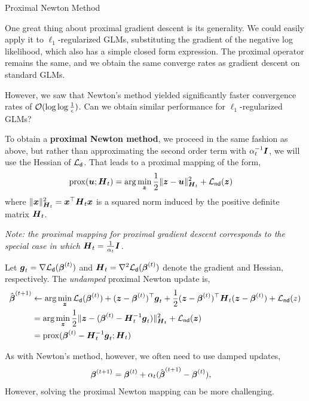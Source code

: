\documentclass[aspectratio=169]{beamer}
\begin{document}
\begin{frame}[t,allowframebreaks]{Proximal Newton Method}\label{proximal-newton-method}

One great thing about proximal gradient descent is its generality. We
could easily apply it to \(\ell_1\)-regularized GLMs, substituting the
gradient of the negative log likelihood, which also has a simple closed
form expression. The proximal operator remains the same, and we obtain
the same converge rates as gradient descent on standard GLMs.

However, we saw that Newton's method yielded significantly faster
convergence rates of \(\mathcal{O}(\log \log \frac{1}{\epsilon})\). Can we
obtain similar performance for \(\ell_1\)-regularized GLMs?

To obtain a \textbf{proximal Newton method}, we proceed in the same
fashion as above, but rather than approximating the second order term
with \(\alpha_t^{-1} \boldsymbol{I}\), we will use the Hessian of
\(\mathcal{L}_{\mathsf{d}}\). That leads to a proximal mapping of the form,
\begin{align*}
\mathrm{prox}(\boldsymbol{u}; \boldsymbol{H}_t) 
&= \arg \min_{\boldsymbol{z}} \frac{1}{2} \| \boldsymbol{z} - \boldsymbol{u} \|_{\boldsymbol{H}_t}^2 + \mathcal{L}_{\mathsf{nd}}(\boldsymbol{z})
\end{align*} where \(\|\boldsymbol{x} \|_{\boldsymbol{H}_t}^2 = \boldsymbol{x}^\top \boldsymbol{H}_t \boldsymbol{x}\) is a
squared norm induced by the positive definite matrix \(\boldsymbol{H}_t\).

\textit{Note: the proximal mapping for
proximal gradient descent corresponds to the special case in which
\(\boldsymbol{H}_t = \frac{1}{\alpha_t} \boldsymbol{I}\).}

Let \(\boldsymbol{g}_t = \nabla \mathcal{L}_{\mathsf{d}}(\boldsymbol{\beta}^{(t)})\) and
\(\boldsymbol{H}_t = \nabla^2 \mathcal{L}_{\mathsf{d}}(\boldsymbol{\beta}^{(t)})\) denote the
gradient and Hessian, respectively. The \emph{undamped} proximal Newton
update is, \begin{align*}
\hat{\boldsymbol{\beta}}^{(t+1)}
&\leftarrow \arg \min_{\boldsymbol{z}} \mathcal{L}_{\mathsf{d}}(\boldsymbol{\beta}^{(t)}) + (\boldsymbol{z} - \boldsymbol{\beta}^{(t)})^\top \boldsymbol{g}_t + \frac{1}{2} (\boldsymbol{z} - \boldsymbol{\beta}^{(t)})^\top \boldsymbol{H}_t (\boldsymbol{z} - \boldsymbol{\beta}^{(t)}) + \mathcal{L}_{\mathsf{nd}}(z) \\
&= \arg \min_{\boldsymbol{z}} \frac{1}{2} \| \boldsymbol{z} - (\boldsymbol{\beta}^{(t)} -  \boldsymbol{H}_t^{-1} \boldsymbol{g}_t)\|_{\boldsymbol{H}_t}^2 + \mathcal{L}_{\mathsf{nd}}(\boldsymbol{z})  \\
&= \mathrm{prox}(\boldsymbol{\beta}^{(t)} -  \boldsymbol{H}_t^{-1} \boldsymbol{g}_t; \boldsymbol{H}_t)
\end{align*}

As with Newton's method, however, we often need to use damped updates,
\begin{align*}
\boldsymbol{\beta}^{(t+1)} &= \boldsymbol{\beta}^{(t)} + \alpha_t (\hat{\boldsymbol{\beta}}^{(t+1)} - \boldsymbol{\beta}^{(t)}),
\end{align*} 
However, solving the proximal Newton
mapping can be more challenging.

\end{frame}
\end{document}
